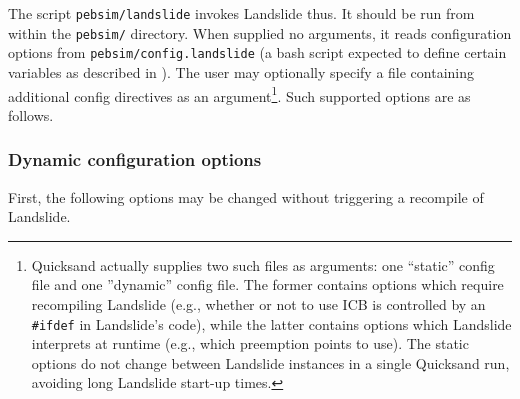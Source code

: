 The script {\tt pebsim/landslide} invokes Landslide thus.
It should be run from within the {\tt pebsim/} directory.
When supplied no arguments, it reads configuration options from {\tt pebsim/config.landslide}
(a bash script expected to define certain variables as described in \sect{\ref{sec:landslide-glue}}).
The user may optionally specify a file containing additional config directives
as an argument\footnote{
Quicksand actually supplies two such files as arguments: one ``static'' config file and one ''dynamic'' config file.
The former contains options which require recompiling Landslide (e.g., whether or not to use ICB is controlled by an {\tt \#ifdef} in Landslide's code),
while the latter contains options which Landslide interprets at runtime (e.g., which preemption points to use).
The static options do not change between Landslide instances in a single Quicksand run,
avoiding long Landslide start-up times.
	}.
Such supported options are as follows.

\subsubsection{Dynamic configuration options}
First, the following options may be changed without triggering a recompile of Landslide.

